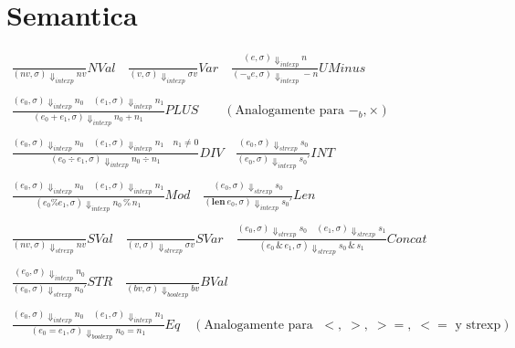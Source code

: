 \documentclass{article}
\begin{document}
\section{Semantica}
\begin{align*}
    \frac{}{(nv, \sigma) \Downarrow_{intexp} nv} NVal \quad
    \frac{}{(v, \sigma) \Downarrow_{intexp} \sigma v} Var \quad
    \frac{(e, \sigma)\Downarrow_{intexp} n}
         {(-_{u}e, \sigma) \Downarrow_{intexp} -n} UMinus \\~\\
    \frac{(e_0, \sigma) \Downarrow _{intexp}n_0 \quad (e_1,\sigma) \Downarrow_{intexp} n_1}
         {(e_0 + e_1, \sigma)\Downarrow _{intexp}n_0 + n_1} PLUS \qquad (\text{Analogamente para }-_b, \times) \\~\\
    \frac{(e_0, \sigma) \Downarrow _{intexp}n_0 \quad (e_1,\sigma) \Downarrow_{intexp} n_1 \quad n_1\neq 0}
         {(e_0 \div e_1, \sigma)\Downarrow _{intexp}n_0 \div n_1} DIV \quad 
    \frac{(e_0, \sigma)\Downarrow_{strexp} s_0}{(e_0,\sigma)\Downarrow_{intexp} {s_0}'} INT\\~\\ 
    \frac{(e_0, \sigma)\Downarrow_{intexp} n_0 \quad (e_1, \sigma)\Downarrow_{intexp} n_1}
         {(e_0 \% e_1, \sigma)\Downarrow _{intexp} n_0 \, \% \, n_1} Mod \quad
    \frac{(e_0,\sigma)\Downarrow _{strexp} s_0}
         {(\textbf{len}\:e_0,\sigma)\Downarrow _{intexp} {s_0}'} Len\\~\\
    \frac{}{(nv, \sigma)\Downarrow _{strexp} nv} SVal \quad
    \frac{}{(v, \sigma)\Downarrow _{strexp}\sigma v} SVar \quad
    \frac{(e_0, \sigma) \Downarrow _{strexp}s_0 \quad (e_1,\sigma) \Downarrow_{strexp} s_1}
         {(e_0\,\&\,e_1, \sigma)\Downarrow _{strexp}s_0 \, \& \, s_1} Concat \\~\\
    \frac{(e_0, \sigma) \Downarrow _{intexp}n_0}
         {(e_0, \sigma)\Downarrow _{strexp}{n_0}'} STR \quad
    \frac{}{(bv, \sigma)\Downarrow _{boolexp}bv} BVal \\~\\
    \frac{(e_0,\sigma)\Downarrow _{intexp} n_0 \quad (e_1,\sigma)\Downarrow _{intexp} n_1}
         {(e_0 = e_1, \sigma)\Downarrow _{boolexp} n_0 = n_1} Eq \quad (\text{Analogamente para }\; <, \;>,\;>=,\;<=\text{ y strexp}) \\~\\

\end{align*}
\end{document}
